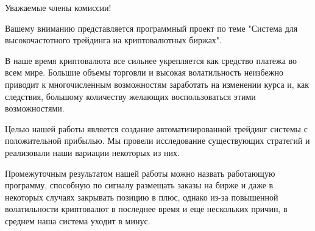 Уважаемые члены комиссии!

Вашему вниманию представляется программный проект по теме "Система для высокочастотного трейдинга на криптовалютных биржах".

В наше время криптовалюта все сильнее укрепляется как средство платежа во всем мире. Большие объемы торговли и высокая волатильность неизбежно приводит к многочисленным возможностям заработать на изменении курса и, как следствия, большому количеству желающих воспользоваться этими возможностями.

Целью нашей работы является создание автоматизированной трейдинг системы с положительной прибылью. Мы провели исследование существующих стратегий и реализовали наши вариации некоторых из них.

Промежуточным результатом нашей работы можно назвать работающую программу, способную по сигналу размещать заказы на бирже и даже в некоторых случаях закрывать позицию в плюс, однако из-за повышенной волатильности криптовалют в последнее время и еще нескольких причин, в среднем наша система уходит в минус.